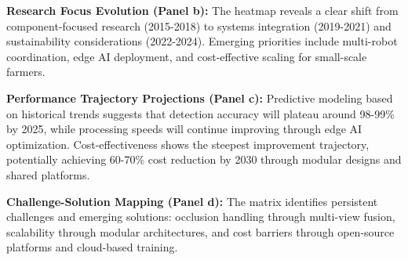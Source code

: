 \documentclass[a4paper,fleqn]{cas-dc}
\begin{document}
\textbf{Research Focus Evolution (Panel b):} The heatmap reveals a clear shift from component-focused research (2015-2018) to systems integration (2019-2021) and sustainability considerations (2022-2024). Emerging priorities include multi-robot coordination, edge AI deployment, and cost-effective scaling for small-scale farmers.

\textbf{Performance Trajectory Projections (Panel c):} Predictive modeling based on historical trends suggests that detection accuracy will plateau around 98-99\% by 2025, while processing speeds will continue improving through edge AI optimization. Cost-effectiveness shows the steepest improvement trajectory, potentially achieving 60-70\% cost reduction by 2030 through modular designs and shared platforms.

\textbf{Challenge-Solution Mapping (Panel d):} The matrix identifies persistent challenges and emerging solutions: occlusion handling through multi-view fusion, scalability through modular architectures, and cost barriers through open-source platforms and cloud-based training.
\end{document}
